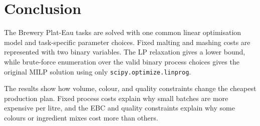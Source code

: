 \section{Conclusion}
\label{sec:conclusion}
The Brewery Plat-Eau tasks are solved with one common linear optimisation model and task-specific parameter choices. Fixed malting and mashing costs are represented with two binary variables. The LP relaxation gives a lower bound, while brute-force enumeration over the valid binary process choices gives the original MILP solution using only \texttt{scipy.optimize.linprog}.

The results show how volume, colour, and quality constraints change the cheapest production plan. Fixed process costs explain why small batches are more expensive per litre, and the EBC and quality constraints explain why some colours or ingredient mixes cost more than others.
